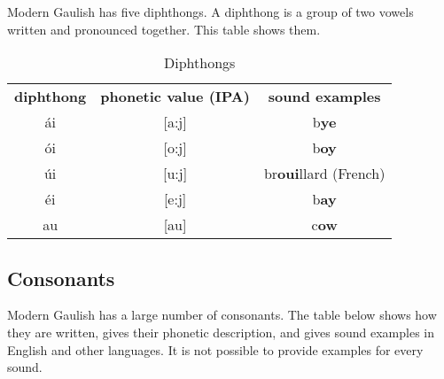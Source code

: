 Modern Gaulish has five diphthongs. A diphthong is a group of two vowels written and pronounced together. This table shows them.

\begin{table}[H]
\begin{center}
\begin{tabular}{ccc}
  \toprule
  \textbf{diphthong} & \textbf{phonetic value (IPA)} & \textbf{sound examples}\\
  \cmidrule(lr){1-1}\cmidrule(lr){2-2}\cmidrule(lr){3-3}
  \'{a}i & [a:j] & b\textbf{ye}\\
  \'{o}i & [o:j] & b\textbf{oy}\\
  \'{u}i & [u:j] & br\textbf{oui}llard (French)\\
  \'{e}i & [e:j] & b\textbf{ay}\\
  au & [au] & c\textbf{ow}\\
  \bottomrule
\end{tabular}
\end{center}
\caption{Diphthongs}
\label{phonology_diphthongs}
\end{table}

\subsection{Consonants}

Modern Gaulish has a large number of consonants. The table below shows how they are written, gives their phonetic description, and gives sound examples in English and other languages. It is not possible to provide examples for every sound.


